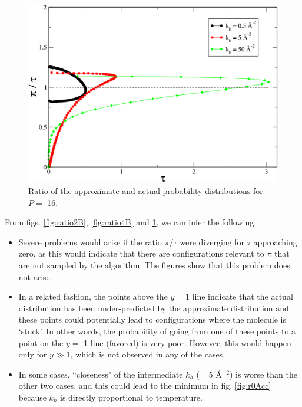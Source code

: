                 \begin{figure}[!htbp]
                    \centering
                    \includegraphics[scale=0.20,keepaspectratio]{Chapter-4/Figures/ratio8B.png}
                    \caption{Ratio of the approximate and actual probability distributions for $P =$ 16.}
                    \label{fig:ratio8B}
                \end{figure}

                From figs. \ref{fig:ratio2B}, \ref{fig:ratio4B} and \ref{fig:ratio8B}, we can infer the following:
                \begin{itemize}
                \item Severe problems would arise if the ratio $\pi/\tau$ were diverging for $\tau$ approaching zero, as this would indicate that there are configurations relevant to $\pi$ that are not sampled by the algorithm. The figures show that this problem does not arise.
                    \item In a related fashion, the points above the $y =1$ line indicate  that the actual distribution has been under-predicted by the approximate distribution and these points could potentially lead to configurations where the molecule is `stuck'. In other words, the probability of going from one of these points to a point on the $y =$ 1-line (favored) is very poor. However, this would happen only for $y \gg 1$, which is not observed in any of the cases.
                    \item In some cases, ``closeness" of the intermediate $k_h$ (= 5 \AA$^{-2}$) is worse than the other two cases, and this could lead to the minimum in fig. \ref{fig:r0Acc} because $k_h$ is directly proportional to temperature.
                \end{itemize}


